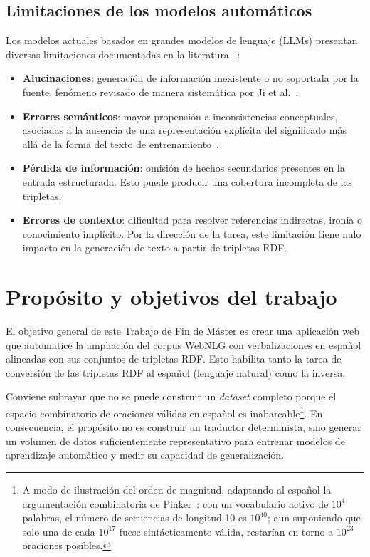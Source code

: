 \subsection{Limitaciones de los modelos automáticos}

Los modelos actuales basados en grandes modelos de lenguaje (LLMs) presentan
diversas limitaciones documentadas en la literatura
~\cite{Ji2023,Bender2021_StochasticParrots,BenderKoller2020_NLU}:

\begin{itemize}
    \item \textbf{Alucinaciones}: generación de información inexistente o no soportada
	      por la fuente, fenómeno revisado de manera sistemática por Ji et
	      al.~\cite{Ji2023}.
	\item \textbf{Errores semánticos}: mayor propensión a inconsistencias conceptuales,
	      asociadas a la ausencia de una representación explícita del significado más
	      allá de la forma del texto de entrenamiento~\cite{BenderKoller2020_NLU}.
	\item \textbf{Pérdida de información}: omisión de hechos secundarios presentes en la
	      entrada estructurada. Esto puede producir una cobertura incompleta de las tripletas.
	\item \textbf{Errores de contexto}: dificultad para resolver referencias indirectas,
	      ironía o conocimiento implícito. Por la dirección de la tarea, este limitación
          tiene nulo impacto en la generación de texto a partir de tripletas RDF.
\end{itemize}

\section{Propósito y objetivos del trabajo}
\label{sec:proposito-objetivos-trabajo}

El objetivo general de este Trabajo de Fin de Máster es crear una aplicación web
que automatice la ampliación del corpus WebNLG con verbalizaciones en español
alineadas con sus conjuntos de tripletas RDF. Esto habilita tanto la tarea de conversión de las tripletas RDF al
español (lenguaje natural) como la inversa.

Conviene subrayar que no se puede construir un \textit{dataset} completo porque
el espacio combinatorio de oraciones válidas en español es
inabarcable\footnote{A modo de ilustración del orden de magnitud, adaptando al
	español la argumentación combinatoria de Pinker~\cite{Pinker1994}: con un
	vocabulario activo de $10^4$ palabras, el número de secuencias de longitud
	10 es $10^{40}$; aun suponiendo que solo una de cada $10^{17}$ fuese
	sintácticamente válida, restarían en torno a $10^{23}$ oraciones posibles.}. En
consecuencia, el propósito no es construir un traductor determinista, sino
generar un volumen de datos suficientemente representativo para entrenar
modelos de aprendizaje automático y medir su capacidad de generalización.

